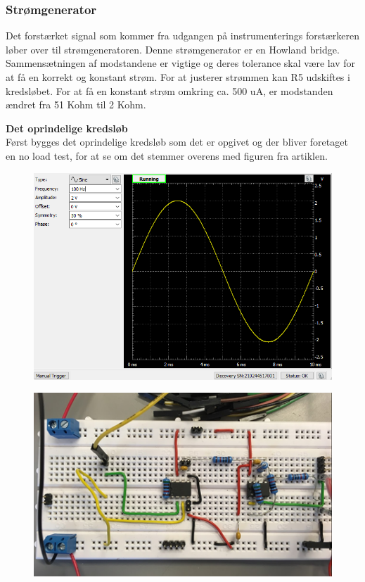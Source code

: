 \documentclass[main.tex]{subfiles}
\begin{document}
\subsubsection{Strømgenerator}
Det forstærket signal som kommer fra udgangen på instrumenterings forstærkeren løber over til strømgeneratoren. Denne strømgenerator er en Howland bridge. Sammensætningen af modstandene er vigtige og deres tolerance skal være lav for at få en korrekt og konstant strøm. For at justerer strømmen kan R5 udskiftes i kredsløbet. For at få en konstant strøm omkring ca. 500 uA, er modstanden ændret fra 51 Kohm til 2 Kohm.  

\textbf{Det oprindelige kredsløb}\\
Først bygges det oprindelige kredsløb som det er opgivet og der bliver foretaget en no load test, for at se om det stemmer overens med figuren fra artiklen.

\begin{figure}[H]
\centering
\begin{minipage}{.5\textwidth}
  \centering
  \includegraphics[width=.9\linewidth]{Figure/VCCSwavegen1}
  \label{fig:test1}
\end{minipage}%
\begin{minipage}{.5\textwidth}
  \centering
  \includegraphics[width=.9\linewidth]{Figure/oprindeligekredslob}
  \label{fig:test2}
\end{minipage}
\end{figure}
\end{document}
